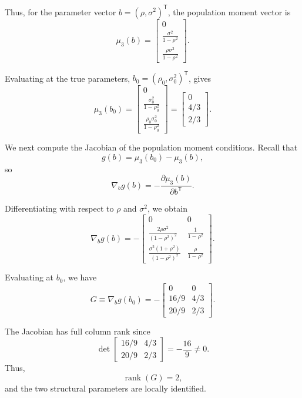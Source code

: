 \documentclass{article}
\begin{document}
Thus, for the parameter vector
$b=(\rho,\sigma^2)^{\mathsf T}$, the population moment vector is
\[
    \mu_3(b)
    =
    \begin{bmatrix}
        0\\[6pt]
        \displaystyle\frac{\sigma^2}{1-\rho^2}\\[10pt]
        \displaystyle\frac{\rho\sigma^2}{1-\rho^2}
    \end{bmatrix}.
\]

Evaluating at the true parameters,
$b_0=(\rho_0,\sigma_0^2)^{\mathsf T}$, gives
\[
    \mu_3(b_0)
    =
    \begin{bmatrix}
        0\\[6pt]
        \displaystyle\frac{\sigma_0^2}{1-\rho_0^2}\\[10pt]
        \displaystyle\frac{\rho_0\sigma_0^2}{1-\rho_0^2}
    \end{bmatrix}
    =
    \begin{bmatrix}
        0\\
        4/3\\
        2/3
    \end{bmatrix}.
\]

We next compute the Jacobian of the population moment conditions.
Recall that
\[
    g(b)=\mu_3(b_0)-\mu_3(b),
\]
so
\[
    \nabla_b g(b)
    =
    -\frac{\partial\mu_3(b)}{\partial b^{\mathsf T}}.
\]

Differentiating with respect to $\rho$ and $\sigma^2$, we obtain
\[
    \nabla_b g(b)
    =
    -
    \begin{bmatrix}
        0 & 0\\[6pt]
        \displaystyle\frac{2\rho\sigma^2}{(1-\rho^2)^2}
        &
        \displaystyle\frac{1}{1-\rho^2}\\[10pt]
        \displaystyle\frac{\sigma^2(1+\rho^2)}{(1-\rho^2)^2}
        &
        \displaystyle\frac{\rho}{1-\rho^2}
    \end{bmatrix}.
\]

Evaluating at $b_0$, we have
\[
    G \equiv \nabla_b g(b_0)
    =
    -
    \begin{bmatrix}
        0 & 0\\
        16/9 & 4/3\\
        20/9 & 2/3
    \end{bmatrix}.
\]

The Jacobian has full column rank since
\[
    \det
    \begin{bmatrix}
        16/9 & 4/3\\
        20/9 & 2/3
    \end{bmatrix}
    =
    -\frac{16}{9}\neq 0.
\]
Thus,
\[
    \operatorname{rank}(G)=2,
\]
and the two structural parameters are locally identified.
\end{document}
